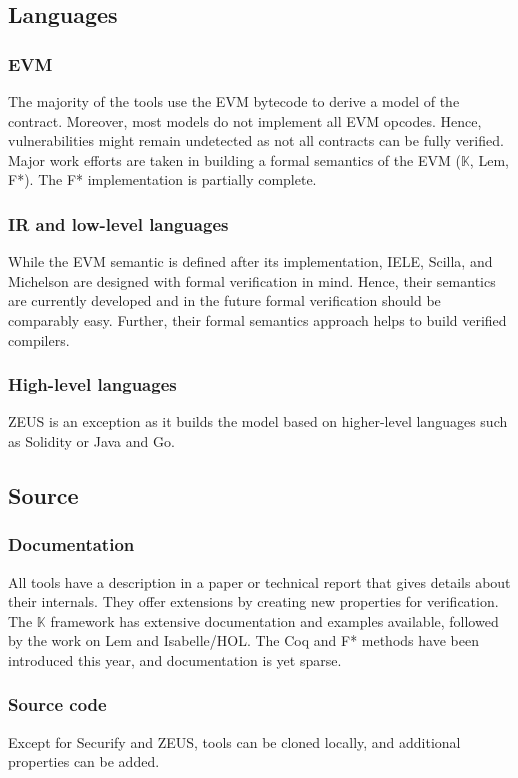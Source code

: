 \subsection{Languages} 
\subsubsection{EVM}
The majority of the tools use the EVM bytecode to derive a model of the contract. Moreover, most models do not implement all EVM opcodes. Hence, vulnerabilities might remain undetected as not all contracts can be fully verified.
Major work efforts are taken in building a formal semantics of the EVM ($\mathbb{K}$, Lem, F*). 
The F* implementation is partially complete. 

\subsubsection{IR and low-level languages}
While the EVM semantic is defined after its implementation, IELE, Scilla, and Michelson are designed with formal verification in mind. Hence, their semantics are currently developed and in the future formal verification should be comparably easy. Further, their formal semantics approach helps to build verified compilers.

\subsubsection{High-level languages}
ZEUS is an exception as it builds the model based on higher-level languages such as Solidity or Java and Go. 

\subsection{Source} 
\subsubsection{Documentation}
All tools have a description in a paper or technical report that gives details about their internals. They offer extensions by creating new properties for verification.
The $\mathbb{K}$ framework has extensive documentation and examples available, followed by the work on Lem and Isabelle/HOL. The Coq and F* methods have been introduced this year, and documentation is yet sparse.

\subsubsection{Source code} Except for Securify and ZEUS, tools can be cloned locally, and additional properties can be added.
